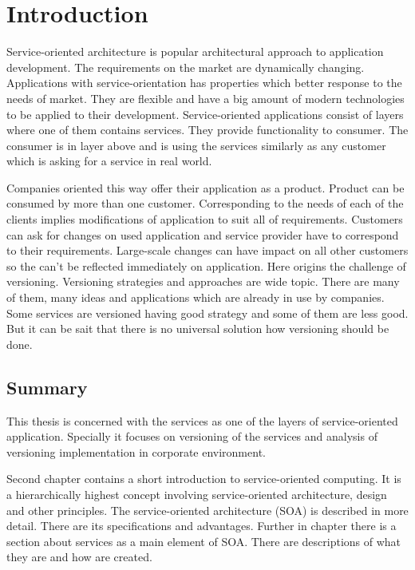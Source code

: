 \chapter{Introduction}
\label{chap:introduction}

Service-oriented architecture is popular architectural approach to application development. The requirements on the market are dynamically changing. Applications with service-orientation has properties which better response to the needs of market. They are flexible and have a big amount of modern technologies to be applied to their development. Service-oriented applications consist of layers where one of them contains services. They provide functionality to consumer. The consumer is in layer above and is using the services similarly as any customer which is asking for a service in real world.

Companies oriented this way offer their application as a product. Product can be consumed by more than one customer. Corresponding to the needs of each of the clients implies modifications of application to suit all of requirements. Customers can ask for changes on used application and service provider have to correspond to their requirements. Large-scale changes can have impact on all other customers so the can't be reflected immediately on application. Here origins the challenge of versioning. Versioning strategies and approaches are wide topic. There are many of them, many ideas and applications which are already in use by companies. Some services are versioned having good strategy and some of them are less good. But it can be sait that there is no universal solution how versioning should be done. 

\section{Summary}

This thesis is concerned with the services as one of the layers of service-oriented application. Specially it focuses on versioning of the services and analysis of versioning implementation in corporate environment. 

Second chapter contains a short introduction to service-oriented computing. It is a hierarchically highest concept involving service-oriented architecture, design and other principles. The service-oriented architecture (SOA) is described in more detail. There are its specifications and advantages. Further in chapter there is a section about services as a main element of SOA. There are descriptions of what they are and how are created.

